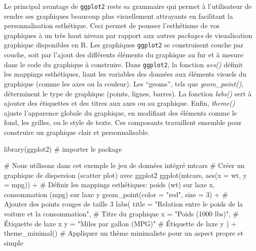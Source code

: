 \documentclass[
  letterpaper,
  DIV=11,
  numbers=noendperiod]{scrreprt}
\newenvironment{Shaded}{\begin{snugshade}}{\end{snugshade}}
\newcommand{\AttributeTok}[1]{\textcolor[rgb]{0.40,0.45,0.13}{#1}}
\newcommand{\CommentTok}[1]{\textcolor[rgb]{0.37,0.37,0.37}{#1}}
\newcommand{\DecValTok}[1]{\textcolor[rgb]{0.68,0.00,0.00}{#1}}
\newcommand{\FunctionTok}[1]{\textcolor[rgb]{0.28,0.35,0.67}{#1}}
\newcommand{\NormalTok}[1]{\textcolor[rgb]{0.00,0.23,0.31}{#1}}
\newcommand{\SpecialCharTok}[1]{\textcolor[rgb]{0.37,0.37,0.37}{#1}}
\newcommand{\StringTok}[1]{\textcolor[rgb]{0.13,0.47,0.30}{#1}}
\begin{document}
Le principal avantage de \texttt{ggplot2} reste sa grammaire qui permet
à l'utilisateur de rendre ses graphiques beaucoup plus visuellement
attrayants en facilitant la personnalisation esthétique. Ceci permet de
pousser l'esthétisme de vos graphiques à un très haut niveau par rapport
aux autres \emph{packages} de visualisation graphique disponibles en R.
Les graphiques \texttt{ggplot2} se construisent couche par couche, soit
par l'ajout des différents éléments du graphique au fur et à mesure dans
le code du graphique à construire. Dans \texttt{ggplot2}, la fonction
\emph{aes()} définit les mappings esthétiques, liant les variables des
données aux éléments visuels du graphique (comme les axes ou la
couleur). Les ``geoms'', tels que \emph{geom\_point()}, déterminent le
type de graphique (points, lignes, barres). La fonction \emph{labs()}
sert à ajouter des étiquettes et des titres aux axes ou au graphique.
Enfin, \emph{theme()} ajuste l'apparence globale du graphique, en
modifiant des éléments comme le fond, les grilles, ou le style de texte.
Ces composants travaillent ensemble pour construire un graphique clair
et personnalisable.

\begin{Shaded}
\begin{Highlighting}[]
\FunctionTok{library}\NormalTok{(ggplot2) }\CommentTok{\# importer le package}

\CommentTok{\# Nous utilisons dans cet exemple le jeu de données intégré mtcars}
\CommentTok{\# Créer un graphique de dispersion (scatter plot) avec ggplot2}
\FunctionTok{ggplot}\NormalTok{(mtcars, }\FunctionTok{aes}\NormalTok{(}\AttributeTok{x =}\NormalTok{ wt, }\AttributeTok{y =}\NormalTok{ mpg)) }\SpecialCharTok{+}  \CommentTok{\# Définir les mappings esthétiques: poids (wt) sur l\textquotesingle{}axe x, consommation (mpg) sur l\textquotesingle{}axe y}
  \FunctionTok{geom\_point}\NormalTok{(}\AttributeTok{color =} \StringTok{"red"}\NormalTok{, }\AttributeTok{size =} \DecValTok{3}\NormalTok{) }\SpecialCharTok{+}  \CommentTok{\# Ajouter des points rouges de taille 3}
  \FunctionTok{labs}\NormalTok{(}
    \AttributeTok{title =} \StringTok{"Relation entre le poids de la voiture et la consommation"}\NormalTok{,  }\CommentTok{\# Titre du graphique}
    \AttributeTok{x =} \StringTok{"Poids (1000 lbs)"}\NormalTok{,  }\CommentTok{\# Étiquette de l\textquotesingle{}axe x}
    \AttributeTok{y =} \StringTok{"Miles par gallon (MPG)"}  \CommentTok{\# Étiquette de l\textquotesingle{}axe y}
\NormalTok{  ) }\SpecialCharTok{+}
  \FunctionTok{theme\_minimal}\NormalTok{()  }\CommentTok{\# Appliquer un thème minimaliste pour un aspect propre et simple}
\end{Highlighting}
\end{Shaded}
\end{document}
